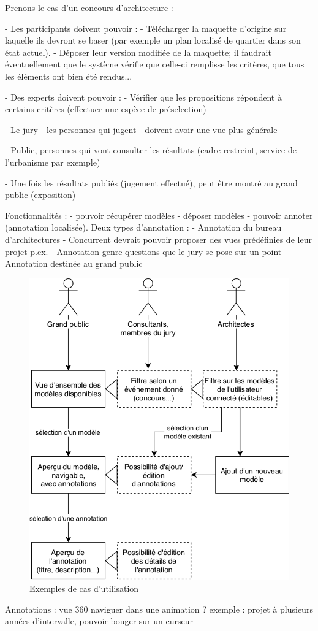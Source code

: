Prenons le cas d'un concours d'architecture :

- Les participants doivent pouvoir :
    - Télécharger la maquette d'origine sur laquelle ils devront se baser (par exemple un plan localisé de quartier dans son état actuel).
    - Déposer leur version modifiée de la maquette; il faudrait éventuellement que le système vérifie que celle-ci remplisse les critères, que tous les éléments ont bien été rendus...

- Des experts doivent pouvoir :
    - Vérifier que les propositions répondent à certains critères (effectuer une espèce de préselection)
    
- Le jury - les personnes qui jugent - doivent avoir une vue plus générale

- Public, personnes qui vont consulter les résultats (cadre restreint, service de l'urbanisme par exemple)

- Une fois les résultats publiés (jugement effectué), peut être montré au grand public (exposition)

Fonctionnalités :
	- pouvoir récupérer modèles
	- déposer modèles
	- pouvoir annoter (annotation localisée). Deux types d'annotation :
		- Annotation du bureau d'architectures
		    - Concurrent devrait pouvoir proposer des vues prédéfinies de leur projet p.ex.
		- Annotation genre questions que le jury se pose sur un point
Annotation  destinée au grand public

\begin{figure}
    \centering
    \includegraphics[width=0.8\linewidth]{Figures/use-cases.png}
    \caption{Exemples de cas d'utilisation}
    \label{fig:use-cases}
\end{figure}

Annotations : vue 360
naviguer dans une animation ? exemple : projet à plusieurs années d’intervalle, pouvoir bouger sur un curseur






